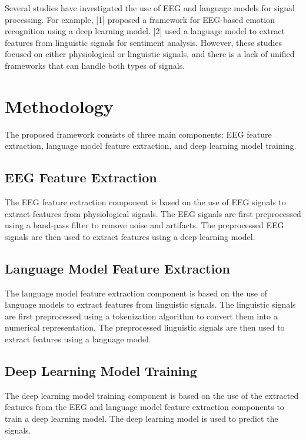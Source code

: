 \documentclass{article}
\begin{document}
Several studies have investigated the use of EEG and language models for signal processing. For example, [1] proposed a framework for EEG-based emotion recognition using a deep learning model. [2] used a language model to extract features from linguistic signals for sentiment analysis. However, these studies focused on either physiological or linguistic signals, and there is a lack of unified frameworks that can handle both types of signals.

\section{Methodology}

The proposed framework consists of three main components: EEG feature extraction, language model feature extraction, and deep learning model training.

\subsection{EEG Feature Extraction}

The EEG feature extraction component is based on the use of EEG signals to extract features from physiological signals. The EEG signals are first preprocessed using a band-pass filter to remove noise and artifacts. The preprocessed EEG signals are then used to extract features using a deep learning model.

\subsection{Language Model Feature Extraction}

The language model feature extraction component is based on the use of language models to extract features from linguistic signals. The linguistic signals are first preprocessed using a tokenization algorithm to convert them into a numerical representation. The preprocessed linguistic signals are then used to extract features using a language model.

\subsection{Deep Learning Model Training}

The deep learning model training component is based on the use of the extracted features from the EEG and language model feature extraction components to train a deep learning model. The deep learning model is used to predict the signals.
\end{document}
